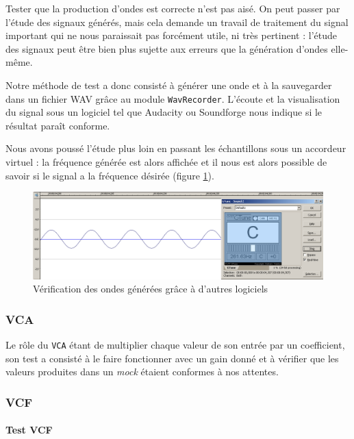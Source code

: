 Tester que la production d'ondes est correcte n'est pas aisé. On
peut passer par l'étude des signaux générés, mais cela demande un
travail de traitement du signal important qui ne nous paraissait
pas forcément utile, ni très pertinent : l'étude des signaux peut
être bien plus sujette aux erreurs que la génération d'ondes
elle-même.

Notre méthode de test a donc consisté à générer une onde et à la
sauvegarder dans un fichier WAV grâce au module \verb!WavRecorder!.
L'écoute et la visualisation du signal sous un logiciel tel que
Audacity ou Soundforge nous indique si le résultat paraît
conforme.

Nous avons poussé l'étude plus loin en passant les échantillons
sous un accordeur virtuel : la fréquence générée est alors affichée
et il nous est alors possible de savoir si le signal a la fréquence
désirée (figure \ref{fig:accordeur}).

\begin{figure}[ht]
\centering
\includegraphics[width=16cm]{../img/png/testWaveGeneratorSinus.png}
\caption{Vérification des ondes générées grâce à d'autres logiciels}
\label{fig:accordeur}
\end{figure}

\subsubsection{VCA}
Le rôle du \verb!VCA! étant de multiplier chaque valeur de son entrée par un coefficient, son test a consisté à le faire fonctionner avec un gain donné et à vérifier que les valeurs produites dans un \emph{mock} étaient conformes à nos attentes.

\subsubsection{VCF}

\paragraph{Test VCF}


